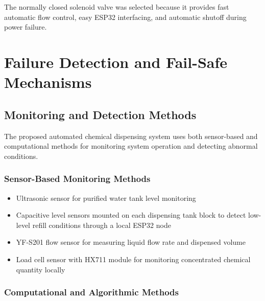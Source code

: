 \documentclass[12pt,a4paper]{report}
\begin{document}
The normally closed solenoid valve was selected because it provides fast automatic flow control, easy ESP32 interfacing, and automatic shutoff during power failure.


\chapter[Failure Detection and Fail-Safe Mechanisms]{Failure Detection and Fail-Safe\\Mechanisms}
\section{Monitoring and Detection Methods}

The proposed automated chemical dispensing system uses both sensor-based and computational methods for monitoring system operation and detecting abnormal conditions.

\subsection{Sensor-Based Monitoring Methods}

\begin{itemize}
    \item Ultrasonic sensor for purified water tank level monitoring

    \item Capacitive level sensors mounted on each dispensing tank block to detect low-level refill conditions through a local ESP32 node

    \item YF-S201 flow sensor for measuring liquid flow rate and dispensed volume

    \item Load cell sensor with HX711 module for monitoring concentrated chemical quantity locally

\end{itemize}

\subsection{Computational and Algorithmic Methods}
\end{document}
